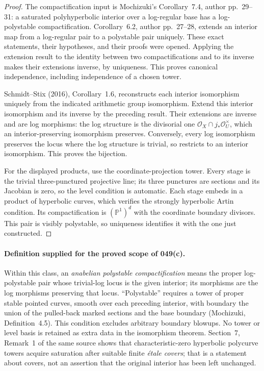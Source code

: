 \begin{proof}
The compactification input is Mochizuki's Corollary~7.4, author
pp.~29--31: a saturated polyhyperbolic interior over a log-regular
base has a log-polystable compactification. Corollary~6.2, author
pp.~27--28, extends an interior map from a log-regular pair to a
polystable pair uniquely. These exact statements, their hypotheses,
and their proofs were opened. Applying the extension result to
the identity between two compactifications and to its inverse
makes their extensions inverse, by uniqueness. This proves
canonical independence, including independence of a chosen tower.

Schmidt--Stix (2016), Corollary~1.6, reconstructs each interior
isomorphism uniquely from the indicated arithmetic group
isomorphism. Extend this interior isomorphism and its inverse by
the preceding result. Their extensions are inverse and are log
morphisms: the log structure is the divisorial one
$\mathcal O_X\cap j_*\mathcal O_U^\times$, which an
interior-preserving isomorphism preserves. Conversely, every log
isomorphism preserves the locus where the log structure is trivial,
so restricts to an interior isomorphism. This proves the bijection.

For the displayed products, use the coordinate-projection tower.
Every stage is the trivial three-punctured projective line; its
three punctures are sections and its Jacobian is zero, so the
level condition is automatic. Each stage embeds in a product of
hyperbolic curves, which verifies the strongly hyperbolic Artin
condition. Its compactification is $(\mathbb P^1)^d$ with the
coordinate boundary divisors. This pair is visibly polystable,
so uniqueness identifies it with the one just constructed.
\end{proof}

\paragraph{Definition supplied for the proved scope of 049(c).}
Within this class, an \emph{anabelian polystable compactification}
means the proper log-polystable pair whose trivial-log locus is
the given interior; its morphisms are the log morphisms preserving
that locus. ``Polystable'' requires a tower of proper stable
pointed curves, smooth over each preceding interior, with boundary
the union of the pulled-back marked sections and the base boundary
(Mochizuki, Definition~4.5). This condition excludes arbitrary
boundary blowups. No tower or level basis is retained as extra
data in the isomorphism theorem. Section~7, Remark~1 of the same
source shows that characteristic-zero hyperbolic polycurve towers
acquire saturation after suitable finite \emph{\'etale covers};
that is a statement about covers, not an assertion that the
original interior has been left unchanged.

